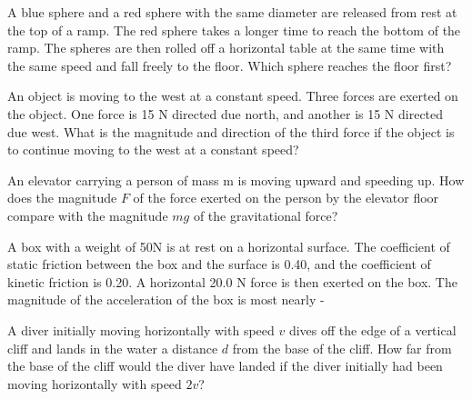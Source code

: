 \documentclass[10pt]{examdesign}
\begin{document}
\begin{multiplechoice} [title={Multiple Choice},
	rearrange=yes]


	
	\begin{question}
A blue sphere and a red sphere with the same diameter are released from rest at the top of a ramp. The red sphere takes a longer time to reach the bottom of the ramp. The spheres are then rolled off a horizontal table at the same time with the same speed and fall freely to the floor. Which sphere reaches the floor first?

	\end{question}

\begin{question}
An object is moving to the west at a constant speed. Three forces are exerted on the object. One force is 15 N directed due north, and another is 15 N directed due west. What is the magnitude and direction of the third force if the object is to continue moving to the west at a constant speed?



	\end{question}


\begin{question}
	An elevator carrying a person of mass m is moving upward and speeding up. How does the magnitude $F$ of the force exerted on the person by the elevator floor compare with the magnitude $mg$ of the gravitational force?

\end{question}


\begin{question}
A box with a weight of 50N is at rest on a horizontal surface. The coefficient of static friction between the box and the surface is 0.40, and the coefficient of kinetic friction is 0.20. A horizontal 20.0 N force is then exerted on the box. The magnitude of the acceleration of the box is most nearly - 


\end{question}

\begin{question}
	A diver initially moving horizontally with speed $v$ dives off the edge of a vertical cliff and lands in the water a distance $d$ from the base of the cliff. How far from the base of the cliff would the diver have landed if the diver  initially had been moving horizontally with speed $2v$?

\end{question}


\end{multiplechoice}
\end{document}
